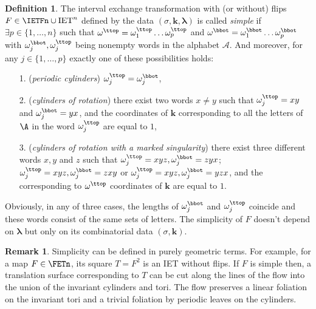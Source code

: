 \documentclass[12pt]{article}
\theoremstyle{definition}
\newtheorem{definition}{Definition}
\newtheorem*{remark}{Remark}
\begin{document}
\begin{definition}\label{def:simple}
The interval exchange transformation with (or without) flips $F \in \IETFn \cup \mathrm{IET}^n$ defined by the data $(\sigma, \boldsymbol{k}, \boldsymbol{ \lambda})$  is called \emph{simple} if $\exists p \in \{1, \ldots, n \}$ such that $\omega^{\ttop}=\omega^{\ttop}_1 \ldots \omega^{\ttop}_p$ and $\omega^{\bbot}=\omega^{\bbot}_1 \ldots \omega^{\bbot}_p$ with $\omega^{\bbot}_j, \omega^{\ttop}_j$ being nonempty words in the alphabet $\mathcal{A}$. And moreover, for any $j \in \{1, \ldots, p \}$ exactly one of these possibilities holds:

\begin{itemize}
\item[1.] (\emph{periodic cylinders}) $\omega^{\ttop}_j=\omega^{\bbot}_j$,
\item[2.] (\emph{cylinders of rotation}) there exist two words $x \neq y$ such that $\omega^{\ttop}_j=xy$ and $\omega^{\bbot}_j=yx$, and the coordinates of $\boldsymbol{k}$ corresponding to all the letters of $\A$ in the word $\omega^{\ttop}_j$ are equal to $1$,
\item[3.] (\emph{cylinders of rotation with a marked singularity})  there exist three different words $x, y$ and $z$ such that $\omega^{\ttop}_j=xyz, \omega^{\bbot}_j=zyx$; $\omega^{\ttop}_j=xyz, \omega^{\bbot}_j=zxy$ or $\omega^{\ttop}_j=xyz, \omega^{\bbot}_j=yzx$, and the corresponding to $\omega^{\ttop}$ coordinates of $\boldsymbol{k}$ are equal to $1$.
\end{itemize}

Obviously, in any of three cases, the lengths of $\omega^{\bbot}_j$ and $\omega^{\ttop}_j$ coincide and these words consist of the same sets of letters. The simplicity of $F$ doesn't depend on $\boldsymbol{\lambda}$ but only on its combinatorial data $(\sigma, \boldsymbol{k})$. 

\end{definition}

\begin{remark}
Simplicity can be defined in purely geometric terms. For example, for a map $F \in \FETn$, its square $T=F^2$ is an IET without flips. If $F$ is simple then, a translation surface corresponding to $T$ can be cut along the lines of the flow into  the union of the invariant cylinders and tori. The flow preserves a linear foliation on the invariant tori and a trivial foliation by periodic leaves on the cylinders.
\end{remark}
\end{document}

